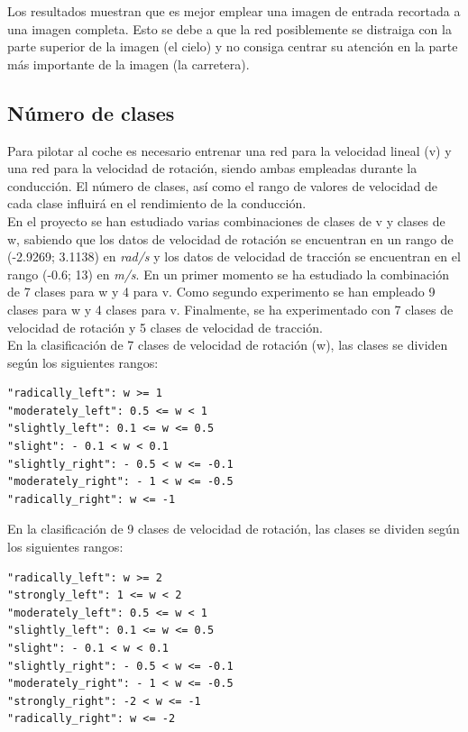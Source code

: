 Los resultados muestran que es mejor emplear una imagen de entrada recortada a una imagen completa. Esto se debe a que la red posiblemente se distraiga con la parte superior de la imagen (el cielo) y no consiga centrar su atención en la parte más importante de la imagen (la carretera).



\subsection{Número de clases}

Para pilotar al coche es necesario entrenar una red para la velocidad lineal (v) y una red para la velocidad de rotación, siendo ambas empleadas durante la conducción. El número de clases, así como el rango de valores de velocidad de cada clase influirá en el rendimiento de la conducción. \\

En el proyecto se han estudiado varias combinaciones de clases de v y clases de w, sabiendo que los datos de velocidad de rotación se encuentran en un rango de (-2.9269; 3.1138) en \textit{rad/s} y los datos de velocidad de tracción se encuentran en el rango (-0.6; 13) en \textit{m/s}. En un primer momento se ha estudiado la combinación de 7 clases para w y 4 para v. Como segundo experimento se han empleado 9 clases para w y 4 clases para v. Finalmente, se ha experimentado con 7 clases de velocidad de rotación y 5 clases de velocidad de tracción.\\


En la clasificación de 7 clases de velocidad de rotación (w), las clases se dividen según los siguientes rangos:

\vspace{10pt}
\begin{lstlisting}
"radically_left": w >= 1
"moderately_left": 0.5 <= w < 1
"slightly_left": 0.1 <= w <= 0.5
"slight": - 0.1 < w < 0.1
"slightly_right": - 0.5 < w <= -0.1
"moderately_right": - 1 < w <= -0.5
"radically_right": w <= -1
\end{lstlisting}
\vspace{20pt}


En la clasificación de 9 clases de velocidad de rotación, las clases se dividen según los siguientes rangos:

\vspace{10pt}
\begin{lstlisting}
"radically_left": w >= 2
"strongly_left": 1 <= w < 2
"moderately_left": 0.5 <= w < 1
"slightly_left": 0.1 <= w <= 0.5
"slight": - 0.1 < w < 0.1
"slightly_right": - 0.5 < w <= -0.1
"moderately_right": - 1 < w <= -0.5
"strongly_right": -2 < w <= -1
"radically_right": w <= -2
\end{lstlisting}
\vspace{20pt}

